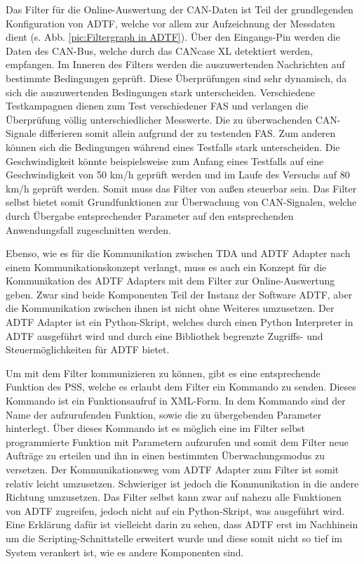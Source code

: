 \documentclass[12pt,a4paper]{report}
\begin{document}
Das Filter für die Online-Auswertung der CAN-Daten ist Teil der grundlegenden Konfiguration von ADTF, welche vor allem zur Aufzeichnung der Messdaten dient (s. Abb. \ref{pic:Filtergraph in ADTF}). Über den Eingangs-Pin werden die Daten des CAN-Bus, welche durch das CANcase XL detektiert werden, empfangen. Im Inneren des Filters werden die auszuwertenden Nachrichten auf bestimmte Bedingungen geprüft. Diese Überprüfungen sind sehr dynamisch, da sich die auszuwertenden Bedingungen stark unterscheiden. Verschiedene Testkampagnen dienen zum Test verschiedener FAS und verlangen die Überprüfung völlig unterschiedlicher Messwerte. Die zu überwachenden CAN-Signale differieren somit allein aufgrund der zu testenden FAS. Zum anderen können sich die Bedingungen während eines Testfalls stark unterscheiden. Die Geschwindigkeit könnte beispielsweise zum Anfang eines Testfalls auf eine Geschwindigkeit von 50 km/h geprüft werden und im Laufe des Versuchs auf 80 km/h geprüft werden. Somit muss das Filter von außen steuerbar sein. Das Filter selbst bietet somit Grundfunktionen zur Überwachung von CAN-Signalen, welche durch Übergabe entsprechender Parameter auf den entsprechenden Anwendungsfall zugeschnitten werden.

Ebenso, wie es für die Kommunikation zwischen TDA und ADTF Adapter nach einem Kommunikationskonzept verlangt, muss es auch ein Konzept für die Kommunikation des ADTF Adapters mit dem Filter zur Online-Auswertung geben. Zwar sind beide Komponenten Teil der Instanz der Software ADTF, aber die Kommunikation zwischen ihnen ist nicht ohne Weiteres umzusetzen. Der ADTF Adapter ist ein Python-Skript, welches durch einen Python Interpreter in ADTF ausgeführt wird und durch eine Bibliothek begrenzte Zugriffs- und Steuermöglichkeiten für ADTF bietet. 

Um mit dem Filter kommunizieren zu können, gibt es eine entsprechende Funktion des PSS, welche es erlaubt dem Filter ein Kommando zu senden. Dieses Kommando ist ein Funktionsaufruf in XML-Form. In dem Kommando sind der Name der aufzurufenden Funktion, sowie die zu übergebenden Parameter hinterlegt. Über dieses Kommando ist es möglich eine im Filter selbst programmierte Funktion mit Parametern aufzurufen und somit dem Filter neue Aufträge zu erteilen und ihn in einen bestimmten Überwachungsmodus zu versetzen. Der Kommunikationsweg vom ADTF Adapter zum Filter ist somit relativ leicht umzusetzen. Schwieriger ist jedoch die Kommunikation in die andere Richtung umzusetzen. Das Filter selbst kann zwar auf nahezu alle Funktionen von ADTF zugreifen, jedoch nicht auf ein Python-Skript, was ausgeführt wird. Eine Erklärung dafür ist vielleicht darin zu sehen, dass ADTF erst im Nachhinein um die Scripting-Schnittstelle erweitert wurde und diese somit nicht so tief im System verankert ist, wie es andere Komponenten sind.
\end{document}
